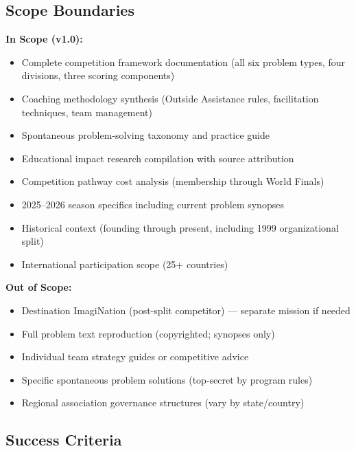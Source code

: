 \documentclass[11pt,letterpaper]{article}
\begin{document}
\subsection{Scope Boundaries}

\textbf{In Scope (v1.0):}
\begin{itemize}[leftmargin=2em]
\item Complete competition framework documentation (all six problem types, four divisions, three scoring components)
\item Coaching methodology synthesis (Outside Assistance rules, facilitation techniques, team management)
\item Spontaneous problem-solving taxonomy and practice guide
\item Educational impact research compilation with source attribution
\item Competition pathway cost analysis (membership through World Finals)
\item 2025--2026 season specifics including current problem synopses
\item Historical context (founding through present, including 1999 organizational split)
\item International participation scope (25+ countries)
\end{itemize}

\textbf{Out of Scope:}
\begin{itemize}[leftmargin=2em]
\item Destination ImagiNation (post-split competitor) --- separate mission if needed
\item Full problem text reproduction (copyrighted; synopses only)
\item Individual team strategy guides or competitive advice
\item Specific spontaneous problem solutions (top-secret by program rules)
\item Regional association governance structures (vary by state/country)
\end{itemize}

\subsection{Success Criteria}
\end{document}
